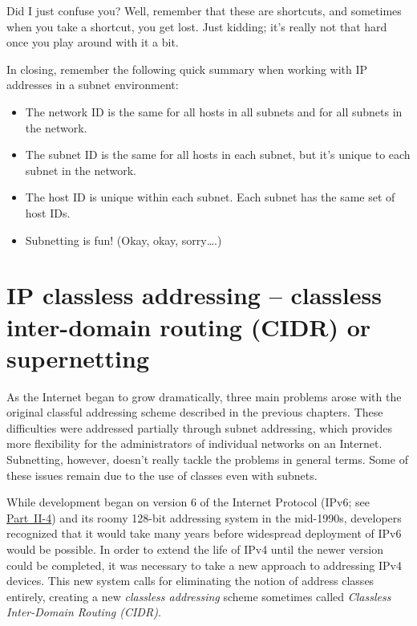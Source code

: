 \documentclass[b5paper,11pt]{memoir}
\begin{document}
Did I just confuse you? Well, remember that these are shortcuts, and
sometimes when you take a shortcut, you get lost. Just kidding; it's
really not that hard once you play around with it a bit.

In closing, remember the following quick summary when working with IP
addresses in a subnet environment:

\begin{itemize}
\item
  The network ID is the same for all hosts in all subnets and for all
  subnets in the network.
\item
  The subnet ID is the same for all hosts in each subnet, but it's
  unique to each subnet in the network.
\item
  The host ID is unique within each subnet. Each subnet has the same set
  of host IDs.
\item
  Subnetting is fun! (Okay, okay, sorry\ldots.)
\end{itemize}




\chapter[IP classless addressing -- CIDR or supernetting]{IP classless addressing -- classless inter-domain routing (CIDR) or supernetting}
\label{chap:kozierok-ch20}


As the Internet began to grow dramatically, three main problems arose
with the original classful addressing scheme described in the previous
chapters. These difficulties were addressed partially through subnet
addressing, which provides more flexibility for the administrators of
individual networks on an Internet. Subnetting, however, doesn't really
tackle the problems in general terms. Some of these issues remain due to
the use of classes even with subnets.

While development began on version 6 of the Internet Protocol
(\protect\hypertarget{ch20.htmlux5cux23idx-CHP-20-0756}{}{}IPv6; see
\protect\hyperlink{pt07.html}{Part~II-4}) and its roomy 128-bit
addressing system in the mid-1990s, developers recognized that it would
take many years before widespread deployment of IPv6 would be possible.
In order to extend the life of IPv4 until the newer version could be
completed, it was necessary to take a new approach to addressing IPv4
devices. This new system calls for eliminating the notion of address
classes entirely, creating a new {\emph{classless addressing}} scheme
sometimes called {\emph{Classless Inter-Domain Routing
(CIDR)}}\protect\hypertarget{ch20.htmlux5cux23idx-CHP-20-0757}{}{}.
\end{document}
